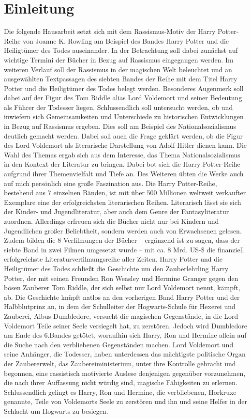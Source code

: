 \section{Einleitung} 
Die folgende Hausarbeit setzt sich mit dem Rassismus-Motiv der \glqq Harry Potter\grqq{}-Reihe von Joanne K. Rowling am Beispiel des Bandes \glqq Harry Potter und die Heiligtümer des Todes\grqq{} auseinander. In der Betrachtung soll dabei zunächst auf wichtige Termini der Bücher in Bezug auf Rassismus eingegangen werden. Im weiteren Verlauf soll der Rassismus in der magischen Welt beleuchtet und an ausgewählten Textpassagen des siebten Bandes der Reihe mit dem Titel \glqq Harry Potter und die Heiligtümer des Todes\grqq{} belegt werden. Besonderes Augenmerk soll dabei auf der Figur des Tom Riddle alias Lord Voldemort und seiner Bedeutung als Führer der Todesser liegen.
Schlussendlich soll untersucht werden, ob und inwiefern sich Gemeinsamkeiten und Unterschiede zu historischen Entwicklungen in Bezug auf Rassismus ergeben. Dies soll am Beispiel des Nationalsozialismus deutlich gemacht werden. Dabei soll auch die Frage geklärt werden, ob die Figur des Lord Voldemort als  literarische Darstellung von Adolf Hitler dienen kann. Die Wahl des Themas ergab sich aus dem Interesse, das Thema \glqq Nationalsozialismus\grqq{} in den Kontext der Literatur zu bringen. Dabei bot sich die \glqq Harry Potter\grqq-Reihe aufgrund ihrer Themenvielfalt und Tiefe an. Des Weiteren übten die Werke auch auf mich persönlich eine große Faszination aus. 
Die \glqq Harry Potter\grqq-Reihe, bestehend aus 7 einzelnen Bänden, ist mit über 500 Millionen weltweit verkaufter Exemplare eine der erfolgreichsten literarischen Reihen. Literarisch lässt sie sich der Kinder- und Jugendliteratur, aber auch dem Genre der Fantasyliteratur zuordnen. Allerdings erfreuen sich die Bücher nicht nur bei Kindern und Jugendlichen großer Beliebtheit, sondern werden auch von Erwachsenen gelesen. Zudem bilden die 8 Verfilmungen der Bücher – ergänzend ist zu sagen, dass der siebte Band in zwei Filmen umgesetzt wurde – mit ca. 8 Mrd. US-\$ die finanziell erfolgreichste Literaturverfilmungsreihe aller Zeiten.
\glqq Harry Potter und die Heiligtümer des Todes\grqq{} schließt die Geschichte um den Zauberlehrling Harry Potter, der mit seinen Freunden Ron Weasley und Hermine Granger gegen den bösen Zauberer Tom Riddle, der sich selbst nur \glqq Lord Voldemort\grqq{} nennt, kämpft, ab. Die Geschichte knüpft natlos an den vorherigen Band \glqq Harry Potter und der Halbblutprinz\grqq{} an, in dem der Schulleiter der Hogwarts-Schule für Hexerei und Zauberei, Albus Dumbledore, versucht die magischen Gegenstände, in die Lord Voldemort Teile seiner Seele versiegelt hat, zu zerstören. Jedoch wird Dumbledore am Ende des 6.Bandes getötet, woraufhin sich Harry, Ron und Hermine allein auf die Suche nach den verbliebenen Gegenständen machen. Lord Voldemort und seine Anhänger, die Todesser, haben unterdessen das mächtigste politische Organ der Zaubererwelt, das Zaubereiministerium, unter ihre Kontrolle gebracht und begonnen, eine rassistisch motivierte \glqq Auslese\grqq{} denjenigen gegenüber vorzunehmen, die nach ihrer Auffassung nicht würdig sind, magische Fähigkeiten zu erlernen. 
Schlussendlich gelingt es Harry, Ron und Hermine, die verbliebenen, Horkruxe genannte, Teile von Voldemorts Seele zu zerstören und ihn und seine Helfer in der \glqq Schlacht um Hogwarts\grqq{} zu besiegen.
